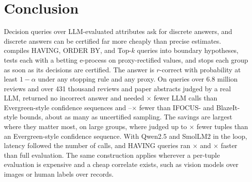 \section{Conclusion}
\label{sec:conclusion}

Decision queries over LLM-evaluated attributes ask for discrete answers, and discrete answers can be certified far more cheaply than precise estimates.
\sys{} compiles HAVING, ORDER BY, and Top-$k$ queries into boundary hypotheses, tests each with a betting e-process on proxy-rectified values, and stops each group as soon as its decisions are certified.
The answer is $r$-correct with probability at least $1-\alpha$ under any stopping rule and any proxy.
On \numNQ{} queries over 6.8 million reviews and over 431 thousand reviews and paper abstracts judged by a real LLM, \sys{} returned no incorrect answer and needed \numRWSR$\times$ fewer LLM calls than Evergreen-style confidence sequences and \numRHS--\numRBSP$\times$ fewer than IFOCUS- and BlazeIt-style bounds, about as many as uncertified sampling.
The savings are largest where they matter most, on large groups, where \sys{} judged up to \numRWSRMAX$\times$ fewer tuples than an Evergreen-style confidence sequence.
With Qwen2.5 and SmolLM2 in the loop, latency followed the number of calls, and HAVING queries ran \numLiveHavingMin$\times$ and \numLiveHavingMax$\times$ faster than full evaluation.
The same construction applies wherever a per-tuple evaluation is expensive and a cheap correlate exists, such as vision models over images or human labels over records.
